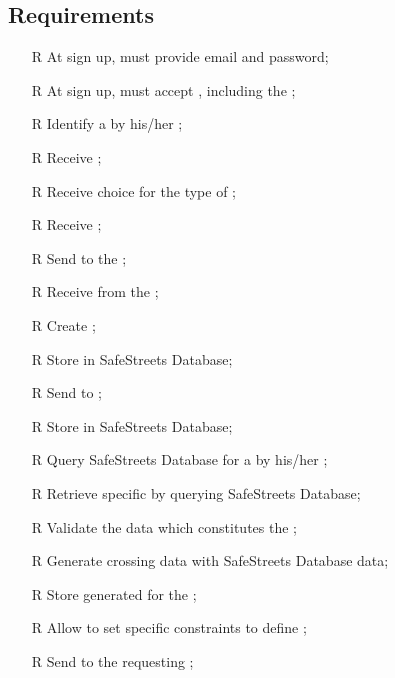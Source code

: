\documentclass[../../../RASD.tex]{subfiles}
\begin{document}
\subsection{Requirements\label{sect:3.2.5}}
\begin{itemize}
	
	\item[R\subs{1}]At sign up,  must provide email and password;
	\item[R\subs{2}]At sign up,  must accept , including the ;
	\item[R\subs{3}]Identify a  by his/her ;
	\item[R\subs{4}]Receive ;
	\item[R\subs{5}]Receive  choice for the type of ;
	\item[R\subs{6}]Receive ;
	\item[R\subs{7}]Send  to the ;
	\item[R\subs{8}]Receive  from the ;
	\item[R\subs{9}]Create ;
	\item[R\subs{10}]Store  in SafeStreets Database;
	\item[R\subs{11}]Send  to ;
	\item[R\subs{12}]Store  in SafeStreets Database;
	\item[R\subs{13}]Query SafeStreets Database for a  by his/her ;
	\item[R\subs{14}]Retrieve specific  by querying SafeStreets Database;
	\item[R\subs{15}]Validate the data which constitutes the ;
	\item[R\subs{16}]Generate  crossing   data with SafeStreets Database data;
	\item[R\subs{17}]Store generated  for the ;
	\item[R\subs{18}]Allow  to set specific constraints to define ;
	\item[R\subs{19}]Send  to the requesting ;

\end{itemize}
\end{document}
